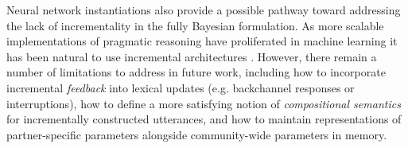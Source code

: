Neural network instantiations also provide a possible pathway toward addressing the lack of incrementality in the fully Bayesian formulation. 
As more scalable implementations of pragmatic reasoning have proliferated in machine learning \cite{vogel2013emergence,AndreasKlein16_Pragmatics,monroe_colors_2017,shen2019pragmatically,takmaz2020refer} it has been natural to use incremental architectures  \cite{augurzky2019gricean,cohn2018pragmatically,cohn2019incremental,waldon2021modeling}. 
However, there remain a number of limitations to address in future work, including how to incorporate incremental \emph{feedback} into lexical updates (e.g. backchannel responses or interruptions), how to define a more satisfying notion of \emph{compositional semantics} for incrementally constructed utterances, and how to maintain representations of partner-specific parameters alongside community-wide parameters in memory. 

%
%


